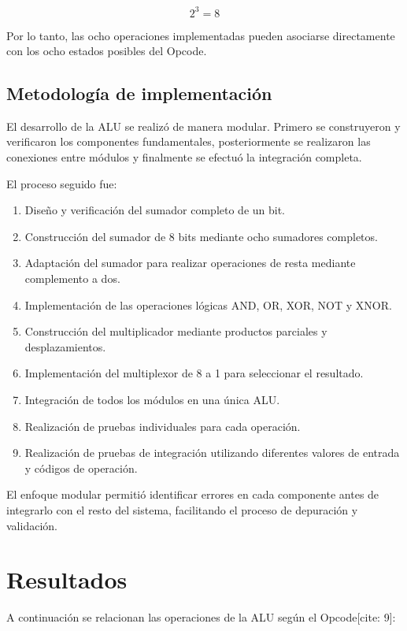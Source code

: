 \documentclass[12pt,a4paper]{article}
\begin{document}
\[
2^3=8
\]

Por lo tanto, las ocho operaciones implementadas pueden asociarse directamente con los ocho estados posibles del Opcode.

\subsection{Metodología de implementación}

El desarrollo de la ALU se realizó de manera modular. Primero se construyeron y verificaron los componentes fundamentales, posteriormente se realizaron las conexiones entre módulos y finalmente se efectuó la integración completa.

El proceso seguido fue:

\begin{enumerate}
    \item Diseño y verificación del sumador completo de un bit.
    \item Construcción del sumador de 8 bits mediante ocho sumadores completos.
    \item Adaptación del sumador para realizar operaciones de resta mediante complemento a dos.
    \item Implementación de las operaciones lógicas AND, OR, XOR, NOT y XNOR.
    \item Construcción del multiplicador mediante productos parciales y desplazamientos.
    \item Implementación del multiplexor de 8 a 1 para seleccionar el resultado.
    \item Integración de todos los módulos en una única ALU.
    \item Realización de pruebas individuales para cada operación.
    \item Realización de pruebas de integración utilizando diferentes valores de entrada y códigos de operación.
\end{enumerate}

El enfoque modular permitió identificar errores en cada componente antes de integrarlo con el resto del sistema, facilitando el proceso de depuración y validación.

\section{Resultados}

A continuación se relacionan las operaciones de la ALU según el Opcode[cite: 9]:
\end{document}

